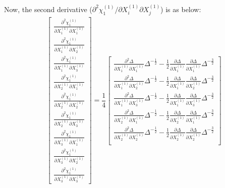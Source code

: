 \documentclass[12pt]{amsart}
\begin{document}
Now, the second derivative ($\partial^2\chi_1^{(1)}/\partial X^{(1)}_i\partial X^{(1)}_j$) is as below:
\begin{equation}
  \label{eq:d2chi_dxdx}
  \begin{split}
    &\begin{bmatrix}
      \frac{\partial^2\chi^{(1)}_1}{\partial X^{(1)}_1\partial X^{(1)}_1}\\
      \frac{\partial^2\chi^{(1)}_1}{\partial X^{(1)}_1\partial X^{(1)}_2}\\
      \frac{\partial^2\chi^{(1)}_1}{\partial X^{(1)}_1\partial X^{(1)}_3}\\
      \frac{\partial^2\chi^{(1)}_1}{\partial X^{(1)}_2\partial X^{(1)}_1}\\
      \frac{\partial^2\chi^{(1)}_1}{\partial X^{(1)}_2\partial X^{(1)}_2}\\
      \frac{\partial^2\chi^{(1)}_1}{\partial X^{(1)}_2\partial X^{(1)}_3}\\
      \frac{\partial^2\chi^{(1)}_1}{\partial X^{(1)}_3\partial X^{(1)}_1}\\
      \frac{\partial^2\chi^{(1)}_1}{\partial X^{(1)}_3\partial X^{(1)}_2}\\
      \frac{\partial^2\chi^{(1)}_1}{\partial X^{(1)}_3\partial X^{(1)}_3}
    \end{bmatrix}
    =\dfrac{1}{4}
    \begin{bmatrix}
      \frac{\partial^2\Delta}{\partial X_1^{(1)} \partial X_1^{(1)}} \Delta^{-\frac{1}{2}} - \frac{1}{2}\frac{\partial\Delta}{\partial X_1^{(1)}} \frac{\partial\Delta}{\partial X_1^{(1)}} \Delta^{-\frac{3}{2}}\\
      \frac{\partial^2\Delta}{\partial X_1^{(1)} \partial X_2^{(1)}} \Delta^{-\frac{1}{2}} - \frac{1}{2}\frac{\partial\Delta}{\partial X_1^{(1)}} \frac{\partial\Delta}{\partial X_2^{(1)}} \Delta^{-\frac{3}{2}}\\
      \frac{\partial^2\Delta}{\partial X_1^{(1)} \partial X_3^{(1)}} \Delta^{-\frac{1}{2}} - \frac{1}{2}\frac{\partial\Delta}{\partial X_1^{(1)}} \frac{\partial\Delta}{\partial X_3^{(1)}} \Delta^{-\frac{3}{2}}\\
      \frac{\partial^2\Delta}{\partial X_2^{(1)} \partial X_1^{(1)}} \Delta^{-\frac{1}{2}} - \frac{1}{2}\frac{\partial\Delta}{\partial X_2^{(1)}} \frac{\partial\Delta}{\partial X_1^{(1)}} \Delta^{-\frac{3}{2}}\\
      \frac{\partial^2\Delta}{\partial X_2^{(1)} \partial X_2^{(1)}} \Delta^{-\frac{1}{2}} - \frac{1}{2}\frac{\partial\Delta}{\partial X_2^{(1)}} \frac{\partial\Delta}{\partial X_2^{(1)}} \Delta^{-\frac{3}{2}}\\

\end{bmatrix}
\end{split}
\end{equation}
\end{document}
